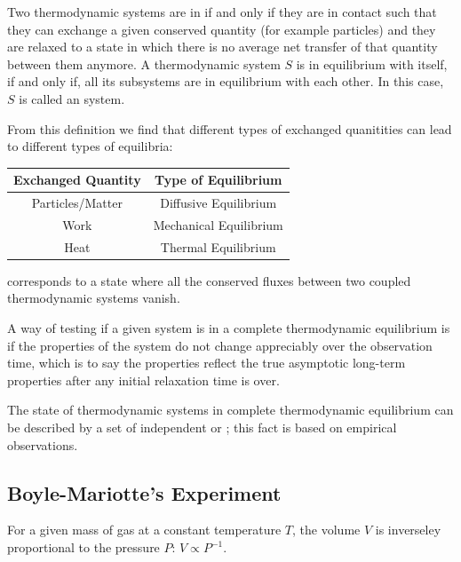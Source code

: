 \documentclass[12pt, a4paper, oneside, openright, titlepage]{book}
\begin{document}
\begin{defn}[Equilibrium]
    Two thermodynamic systems are in  if and only if they are in contact such that they can exchange a given conserved quantity (for example particles) and they are relaxed to a state in which there is no average net transfer of that quantity between them anymore. A thermodynamic system $S$ is in equilibrium with itself, if and only if, all its subsystems are in equilibrium with each other. In this case, $S$ is called an  system.
\end{defn}

From this definition we find that different types of exchanged quanitities can lead to different types of equilibria: 

\begin{table}[H]
    \centering
    \begin{tabular}{c|c}
        \hline
        Exchanged Quantity & Type of Equilibrium \\ \hline \hline
        Particles/Matter & Diffusive Equilibrium \\ 
        Work & Mechanical Equilibrium \\
        Heat & Thermal Equilibrium \\ \hline
    \end{tabular}
\end{table}

\begin{defn}
     corresponds to a state where all the conserved fluxes between two coupled thermodynamic systems vanish.
\end{defn}

A way of testing if a given system is in a complete thermodynamic equilibrium is if the properties of the system do not change appreciably over the observation time, which is to say the properties reflect the true asymptotic long-term properties after any initial relaxation time is over.

The state of thermodynamic systems in complete thermodynamic equilibrium can be described by a set of independent  or ; this fact is based on empirical observations. 

\subsection{Boyle-Mariotte's Experiment}

\begin{law}
    For a given mass of gas at a constant temperature $T$, the volume $V$ is inverseley proportional to the pressure $P$: $V \propto P^{-1}$.
\end{law}
\end{document}
